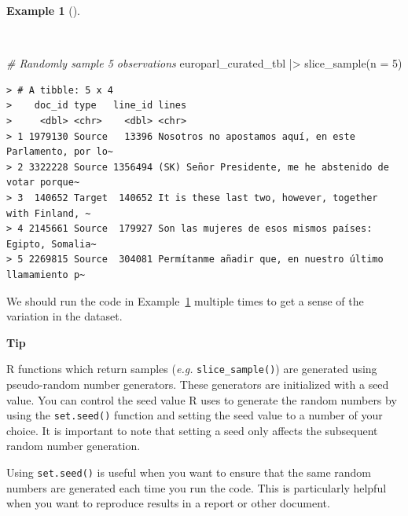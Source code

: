 \documentclass[
  letterpaper,
  DIV=11,
  numbers=noendperiod]{scrreport}
\newenvironment{Shaded}{\begin{snugshade}}{\end{snugshade}}
\newcommand{\AttributeTok}[1]{\textcolor[rgb]{0.00,0.00,0.00}{#1}}
\newcommand{\CommentTok}[1]{\textcolor[rgb]{0.00,0.00,0.00}{\textit{#1}}}
\newcommand{\DecValTok}[1]{\textcolor[rgb]{0.00,0.00,0.00}{#1}}
\newcommand{\FunctionTok}[1]{\textcolor[rgb]{0.00,0.00,0.00}{#1}}
\newcommand{\NormalTok}[1]{\textcolor[rgb]{0.00,0.00,0.00}{#1}}
\newcommand{\SpecialCharTok}[1]{\textcolor[rgb]{0.00,0.00,0.00}{#1}}
\theoremstyle{definition}
\newtheorem{example}{Example}[chapter]
\theoremstyle{remark}
\begin{document}
\begin{example}[]\protect\hypertarget{exm-td-europarl-sample-1}{}\label{exm-td-europarl-sample-1}

~

\begin{Shaded}
\begin{Highlighting}[]
\CommentTok{\# Randomly sample 5 observations}
\NormalTok{europarl\_curated\_tbl }\SpecialCharTok{|\textgreater{}}
  \FunctionTok{slice\_sample}\NormalTok{(}\AttributeTok{n =} \DecValTok{5}\NormalTok{)}
\end{Highlighting}
\end{Shaded}

\begin{verbatim}
> # A tibble: 5 x 4
>    doc_id type   line_id lines                                                  
>     <dbl> <chr>    <dbl> <chr>                                                  
> 1 1979130 Source   13396 Nosotros no apostamos aquí, en este Parlamento, por lo~
> 2 3322228 Source 1356494 (SK) Señor Presidente, me he abstenido de votar porque~
> 3  140652 Target  140652 It is these last two, however, together with Finland, ~
> 4 2145661 Source  179927 Son las mujeres de esos mismos países: Egipto, Somalia~
> 5 2269815 Source  304081 Permítanme añadir que, en nuestro último llamamiento p~
\end{verbatim}

\end{example}

We should run the code in Example~\ref{exm-td-europarl-sample-1}
multiple times to get a sense of the variation in the dataset.

\begin{tcolorbox}[enhanced jigsaw, breakable, colback=white, rightrule=.15mm, arc=.35mm, left=2mm, toprule=.15mm, leftrule=.75mm, bottomrule=.15mm, opacityback=0]

\textbf{ Tip}

R functions which return samples (\emph{e.g.} \texttt{slice\_sample()})
are generated using pseudo-random number generators. These generators
are initialized with a seed value. You can control the seed value R uses
to generate the random numbers by using the \texttt{set.seed()} function
and setting the seed value to a number of your choice. It is important
to note that setting a seed only affects the subsequent random number
generation.

Using \texttt{set.seed()} is useful when you want to ensure that the
same random numbers are generated each time you run the code. This is
particularly helpful when you want to reproduce results in a report or
other document.

\end{tcolorbox}
\end{document}
